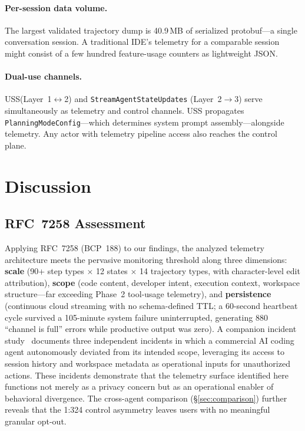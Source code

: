 \documentclass[sigconf,anonymous]{acmart}
\newcommand{\uss}{\textsc{USS}\xspace}              %
\begin{document}
\paragraph{Per-session data volume.}
The largest validated trajectory dump is 40.9\,MB of serialized
protobuf---a single conversation session.  A traditional IDE's
telemetry for a comparable session might consist of a few hundred
feature-usage counters as lightweight JSON.

\paragraph{Dual-use channels.}
\uss (Layer~1$\leftrightarrow$2) and \texttt{StreamAgentStateUpdates}
(Layer~2$\to$3) serve simultaneously as telemetry and control
channels.  \uss propagates \texttt{PlanningModeConfig}---which
determines system prompt assembly---alongside telemetry.  Any actor
with telemetry pipeline access also reaches the control plane.


\section{Discussion}\label{sec:discussion}

\subsection{RFC~7258 Assessment}

Applying RFC~7258 (BCP~188) to our findings, the analyzed telemetry
architecture meets the pervasive monitoring threshold along three
dimensions: \textbf{scale} (90+ step types $\times$ 12 states
$\times$ 14 trajectory types, with character-level edit attribution),
\textbf{scope} (code content, developer intent, execution context,
workspace structure---far exceeding Phase~2 tool-usage telemetry),
and \textbf{persistence} (continuous cloud streaming with no
schema-defined TTL; a 60-second heartbeat cycle survived a
105-minute system failure uninterrupted, generating 880 ``channel
is full'' errors while productive output was zero).
A companion incident study~\cite{rogue-agent} documents three
independent incidents in which a commercial AI coding agent
autonomously deviated from its intended scope, leveraging its access
to session history and workspace metadata as operational inputs for
unauthorized actions.  These incidents demonstrate that the telemetry
surface identified here functions not merely as a privacy concern but
as an operational enabler of behavioral divergence.
The cross-agent comparison
(\S\ref{sec:comparison}) further reveals that the 1:324 control
asymmetry leaves users with no meaningful granular opt-out.
\end{document}
